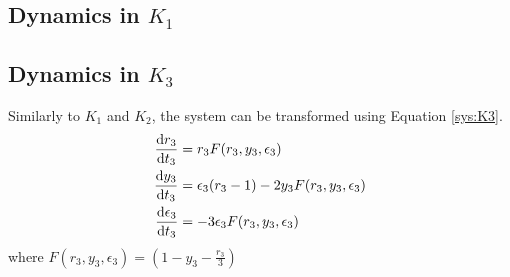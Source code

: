 \subsection{Dynamics in \texorpdfstring{$K_1$}{K1}}

\subsection{Dynamics in \texorpdfstring{$K_3$}{K3}}
Similarly to $K_1$ and $K_2$, the system can be transformed using Equation \ref{sys:K3}.
\begin{align*}
\od{r_3}{t_3}&=r_3F(r_3,y_3,\epsilon_3)\\
\od{y_3}{t_3}&=\epsilon_3(r_3-1)-2y_3F(r_3,y_3,\epsilon_3)\\
\od{\epsilon_3}{t_3}&=-3\epsilon_3F(r_3,y_3,\epsilon_3)
\end{align*}
where $F(r_3,y_3,\epsilon_3)=\left(1-y_3-\frac{r_3}{3}\right)$
\newpage